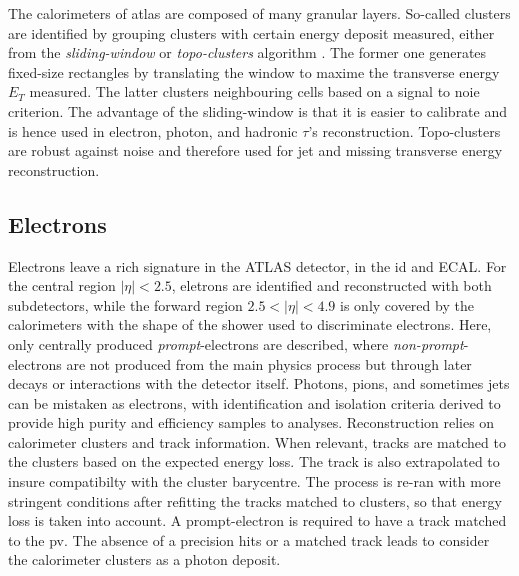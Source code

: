 The calorimeters of atlas are composed of many granular layers. So-called clusters are identified by grouping clusters with certain energy deposit measured, either from the \textit{sliding-window} or \textit{topo-clusters} algorithm \cite{Lampl:1099735}. The former one generates fixed-size rectangles by translating the window to maxime the transverse energy $E_T$ measured. The latter clusters neighbouring cells based on a signal to noie criterion. The advantage of the sliding-window is that it is easier to calibrate and is hence used in electron, photon, and hadronic $\tau$'s reconstruction. Topo-clusters are robust against noise and therefore used for jet and missing transverse energy reconstruction.

\subsection{Electrons}
Electrons leave a rich signature in the ATLAS detector, in the \gls{id} and ECAL. For the central region $|\eta| < 2.5$, eletrons are identified and reconstructed with both subdetectors, while the forward region $2.5 < |\eta| < 4.9$ is only covered by the calorimeters with the shape of the shower used to discriminate electrons. Here, only centrally produced \textit{prompt}-electrons are described, where \textit{non-prompt}-electrons are not produced from the main physics process but through later decays or interactions with the detector itself. Photons, pions, and sometimes jets can be mistaken as electrons, with identification and isolation criteria derived to provide high purity and efficiency samples to analyses. Reconstruction relies on calorimeter clusters and track information. When relevant, tracks are matched to the clusters based on the expected energy loss. The track is also extrapolated to insure compatibilty with the cluster barycentre. The process is re-ran with more stringent conditions after refitting the tracks matched to clusters, so that energy loss is taken into account. A prompt-electron is required to have a track matched to the \gls{pv}. The absence of a precision hits or a matched track leads to consider the calorimeter clusters as a photon deposit. \\

